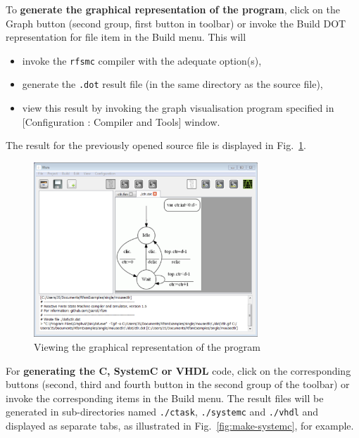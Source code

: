 \medskip
To \textbf{generate the graphical representation of the program}, click on the \textsf{Graph} button
(second group, first button in toolbar) or invoke the \textsf{Build DOT representation for file}
item in the \textsf{Build} menu. This will
\begin{itemize}
\item invoke the \verb|rfsmc| compiler with the adequate option(s),
\item generate the \texttt{.dot} result file (in the same directory as the source file),
\item view this result by invoking the graph visualisation program specified in 
  [\textsf{Configuration : Compiler and Tools}] window.
\end{itemize}

The result for the previously opened source file is displayed in Fig.~\ref{fig:make-dot}.

\begin{figure}[h]
  \centering
  \includegraphics[width=0.75\textwidth]{figs/gui/make-dot}
  \caption{Viewing the graphical representation of the program}
  \label{fig:make-dot}
\end{figure}

\medskip For \textbf{generating the C, SystemC or VHDL} code, click on the corresponding buttons
(second, third and fourth button in the second group of the toolbar) or invoke the corresponding
items in the \textsf{Build} menu. The result files will be generated in sub-directories named
\verb|./ctask|, \verb|./systemc| and \verb|./vhdl| and displayed as separate tabs, as
illustrated in Fig.~\ref{fig:make-systemc}, for example.

